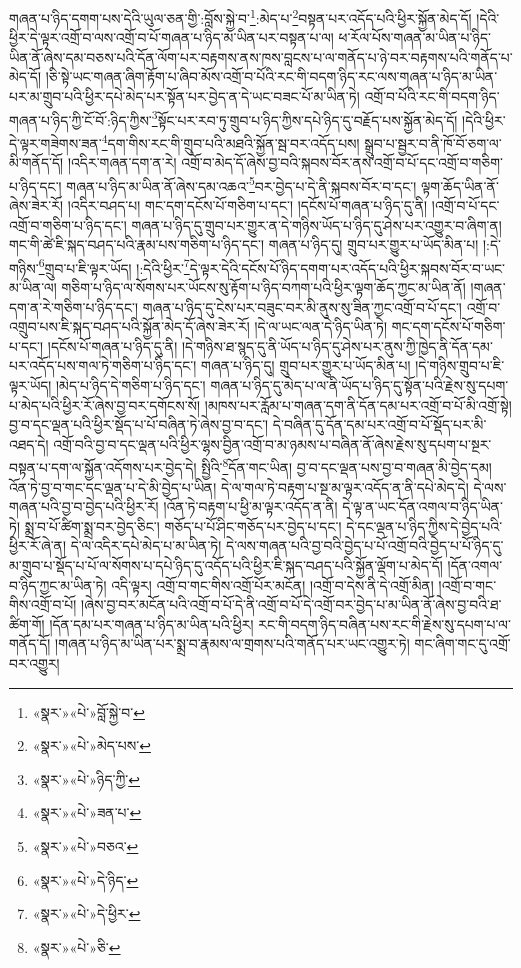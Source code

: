 གཞན་པ་ཉིད་དགག་པས་དེའི་ཡུལ་ཅན་གྱི་:བློས་སྐྱེ་བ་\footnote{«སྣར་»«པེ་»བློ་སྐྱེ་བ་}:མེད་པ་\footnote{«སྣར་»«པེ་»མེད་པས་}བསྟན་པར་འདོད་པའི་ཕྱིར་སྐྱོན་མེད་དོ། །དེའི་ཕྱིར་དེ་ལྟར་འགྲོ་བ་ལས་འགྲོ་བ་པོ་གཞན་པ་ཉིད་མ་ཡིན་པར་བསྟན་པ་ལ། ཕ་རོལ་པོས་གཞན་མ་ཡིན་པ་ཉིད་ཡིན་ནོ་ཞེས་དམ་བཅས་པའི་དོན་ལོག་པར་བརྟགས་ནས་ཁས་བླངས་པ་ལ་གནོད་པ་ཉེ་བར་བརྟགས་པའི་གནོད་པ་མེད་དོ། །ཅི་སྟེ་ཡང་གཞན་ཞིག་རྟོག་པ་ཞིབ་མོས་འགྲོ་བ་པོའི་རང་གི་བདག་ཉིད་རང་ལས་གཞན་པ་ཉིད་མ་ཡིན་པར་མ་གྲུབ་པའི་ཕྱིར་དཔེ་མེད་པར་སྟོན་པར་བྱེད་ན་དེ་ཡང་བཟང་པོ་མ་ཡིན་ཏེ། འགྲོ་བ་པོའི་རང་གི་བདག་ཉིད་གཞན་པ་ཉིད་ཀྱི་ངོ་བོ་:ཉིད་ཀྱིས་\footnote{«སྣར་»«པེ་»ཉིད་ཀྱི་}སྟོང་པར་རབ་ཏུ་གྲུབ་པ་ཉིད་ཀྱིས་དཔེ་ཉིད་དུ་བརྗོད་པས་སྐྱོན་མེད་དོ། །དེའི་ཕྱིར་དེ་ལྟར་གཟེགས་ཟན་\footnote{«སྣར་»«པེ་»ཟན་པ་}དག་གིས་རང་གི་གྲུབ་པའི་མཐའི་སྐྱོན་སྦ་བར་འདོད་པས། སྒྲུབ་པ་སྦྱར་བ་ནི་ཁོ་བོ་ཅག་ལ་མི་གནོད་དོ། །འདིར་གཞན་དག་ན་རེ། འགྲོ་བ་མེད་དོ་ཞེས་བྱ་བའི་སྐབས་བོར་ནས་འགྲོ་བ་པོ་དང་འགྲོ་བ་གཅིག་པ་ཉིད་དང་། གཞན་པ་ཉིད་མ་ཡིན་ནོ་ཞེས་དམ་འཆའ་\footnote{«སྣར་»«པེ་»བཅའ་}བར་བྱེད་པ་དེ་ནི་སྐབས་བོར་བ་དང་། ལྟག་ཆོད་ཡིན་ནོ་ཞེས་ཟེར་རོ། །འདིར་བཤད་པ། གང་དག་དངོས་པོ་གཅིག་པ་དང་། །དངོས་པོ་གཞན་པ་ཉིད་དུ་ནི། །འགྲོ་བ་པོ་དང་འགྲོ་བ་གཅིག་པ་ཉིད་དང་། གཞན་པ་ཉིད་དུ་གྲུབ་པར་གྱུར་ན་དེ་གཉིས་ཡོད་པ་ཉིད་དུ་ཤེས་པར་འགྱུར་བ་ཞིག་ན། གང་གི་ཚེ་ཇི་སྐད་བཤད་པའི་རྣམ་པས་གཅིག་པ་ཉིད་དང་། གཞན་པ་ཉིད་དུ། གྲུབ་པར་གྱུར་པ་ཡོད་མིན་པ། །:དེ་གཉིས་\footnote{«སྣར་»«པེ་»དེ་ཉིད་}གྲུབ་པ་ཇི་ལྟར་ཡོད། །:དེའི་ཕྱིར་\footnote{«སྣར་»«པེ་»དེ་ཕྱིར་}དེ་ལྟར་དེའི་དངོས་པོ་ཉིད་དགག་པར་འདོད་པའི་ཕྱིར་སྐབས་བོར་བ་ཡང་མ་ཡིན་ལ། གཅིག་པ་ཉིད་ལ་སོགས་པར་ཡོངས་སུ་རྟོག་པ་ཉིད་བཀག་པའི་ཕྱིར་ལྟག་ཆོད་ཀྱང་མ་ཡིན་ནོ། །གཞན་དག་ན་རེ་གཅིག་པ་ཉིད་དང་། གཞན་པ་ཉིད་དུ་ངེས་པར་བཟུང་བར་མི་ནུས་སུ་ཟིན་ཀྱང་འགྲོ་བ་པོ་དང་། འགྲོ་བ་འགྲུབ་པས་ཇི་སྐད་བཤད་པའི་སྐྱོན་མེད་དོ་ཞེས་ཟེར་རོ། །དེ་ལ་ཡང་ལན་དེ་ཉིད་ཡིན་ཏེ། གང་དག་དངོས་པོ་གཅིག་པ་དང་། །དངོས་པོ་གཞན་པ་ཉིད་དུ་ནི། །དེ་གཉིས་ཐ་སྙད་དུ་ནི་ཡོད་པ་ཉིད་དུ་ཤེས་པར་ནུས་ཀྱི་ཁྱེད་ནི་དོན་དམ་པར་འདོད་པས་གལ་ཏེ་གཅིག་པ་ཉིད་དང་། གཞན་པ་ཉིད་དུ། གྲུབ་པར་གྱུར་པ་ཡོད་མིན་པ། །དེ་གཉིས་གྲུབ་པ་ཇི་ལྟར་ཡོད། །མེད་པ་ཉིད་དེ་གཅིག་པ་ཉིད་དང་། གཞན་པ་ཉིད་དུ་མེད་པ་ལ་ནི་ཡོད་པ་ཉིད་དུ་སྟོན་པའི་རྗེས་སུ་དཔག་པ་མེད་པའི་ཕྱིར་རོ་ཞེས་བྱ་བར་དགོངས་སོ། །མཁས་པར་རློམ་པ་གཞན་དག་ནི་དོན་དམ་པར་འགྲོ་བ་པོ་མི་འགྲོ་སྟེ། བྱ་བ་དང་ལྡན་པའི་ཕྱིར་སྡོད་པ་པོ་བཞིན་ཏེ་ཞེས་བྱ་བ་དང་། དེ་བཞིན་དུ་དོན་དམ་པར་འགྲོ་བ་པོ་སྡོད་པར་མི་འཐད་དེ། འགྲོ་བའི་བྱ་བ་དང་ལྡན་པའི་ཕྱིར་ལྷས་བྱིན་འགྲོ་བ་མ་ཉམས་པ་བཞིན་ནོ་ཞེས་རྗེས་སུ་དཔག་པ་སྔར་བསྟན་པ་དག་ལ་སྐྱོན་འདོགས་པར་བྱེད་དེ། སྤྱིའི་\footnote{«སྣར་»«པེ་»ཅི་}དོན་གང་ཡིན། བྱ་བ་དང་ལྡན་པས་བྱ་བ་གཞན་མི་བྱེད་དམ། འོན་ཏེ་བྱ་བ་གང་དང་ལྡན་པ་དེ་མི་བྱེད་པ་ཡིན། དེ་ལ་གལ་ཏེ་བརྟག་པ་སྔ་མ་ལྟར་འདོད་ན་ནི་དཔེ་མེད་དེ། དེ་ལས་གཞན་པའི་བྱ་བ་བྱེད་པའི་ཕྱིར་རོ། །འོན་ཏེ་བརྟག་པ་ཕྱི་མ་ལྟར་འདོད་ན་ནི། དེ་ལྟ་ན་ཡང་དོན་འགལ་བ་ཉིད་ཡིན་ཏེ། སྨྲ་བ་པོ་ཚིག་སྨྲ་བར་བྱེད་ཅིང་། གཅོད་པ་པོ་ཤིང་གཅོད་པར་བྱེད་པ་དང་། དེ་དང་ལྡན་པ་ཉིད་ཀྱིས་དེ་བྱེད་པའི་ཕྱིར་རོ་ཞེ་ན། དེ་ལ་འདིར་དཔེ་མེད་པ་མ་ཡིན་ཏེ། དེ་ལས་གཞན་པའི་བྱ་བའི་བྱེད་པ་པོ་འགྲོ་བའི་བྱེད་པ་པོ་ཉིད་དུ་མ་གྲུབ་པ་སྡོད་པ་པོ་ལ་སོགས་པ་དཔེ་ཉིད་དུ་འདོད་པའི་ཕྱིར་ཇི་སྐད་བཤད་པའི་སྐྱོན་ལྡོག་པ་མེད་དོ། །དོན་འགལ་བ་ཉིད་ཀྱང་མ་ཡིན་ཏེ། འདི་ལྟར། འགྲོ་བ་གང་གིས་འགྲོ་པོར་མངོན། །འགྲོ་བ་དེས་ནི་དེ་འགྲོ་མིན། །འགྲོ་བ་གང་གིས་འགྲོ་བ་པོ། །ཞེས་བྱ་བར་མངོན་པའི་འགྲོ་བ་པོ་དེ་ནི་འགྲོ་བ་པོ་དེ་འགྲོ་བར་བྱེད་པ་མ་ཡིན་ནོ་ཞེས་བྱ་བའི་ཐ་ཚིག་གོ། །དོན་དམ་པར་གཞན་པ་ཉིད་མ་ཡིན་པའི་ཕྱིར། རང་གི་བདག་ཉིད་བཞིན་པས་རང་གི་རྗེས་སུ་དཔག་པ་ལ་གནོད་དོ། །གཞན་པ་ཉིད་མ་ཡིན་པར་སྨྲ་བ་རྣམས་ལ་གྲགས་པའི་གནོད་པར་ཡང་འགྱུར་ཏེ། གང་ཞིག་གང་དུ་འགྲོ་བར་འགྱུར། 